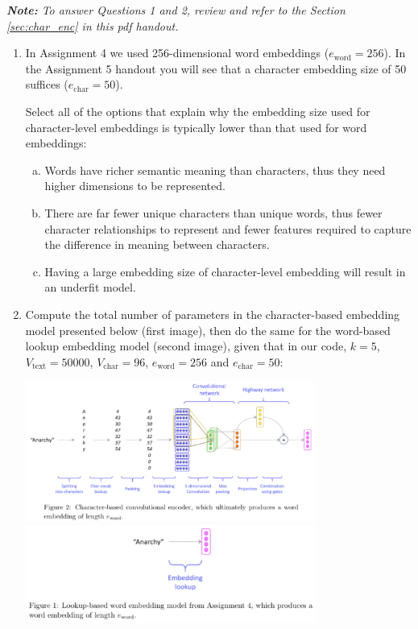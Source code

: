 {\em {\bf Note:} To answer Questions 1 and 2, review and refer to the Section \ref{sec:char_enc} in this pdf handout.}

\begin{enumerate}[1.]

\item {}

In Assignment 4 we used 256-dimensional word embeddings ($e_\text{word} = 256$). In the Assignment 5 handout you will see that a character embedding size of 50 suffices ($e_\text{char} = 50$).

Select all of the options that explain why the embedding size used for character-level embeddings is typically lower than that used for word embeddings:

\begin{enumerate}[(a)]
\item Words have richer semantic meaning than characters, thus they need higher dimensions to be represented.
\item There are far fewer unique characters than unique words, thus fewer character relationships to represent and fewer features required to capture the difference in meaning between characters.
\item Having a large embedding size of character-level embedding will result in an underfit model.
\end{enumerate}


\item Compute the total number of parameters in the character-based embedding model presented below (first image), then do the same for the word-based lookup embedding model (second image), given that in our code, $k = 5$, $V_\text{text}  = 50000$, $V_\text{char} = 96$, $e_\text{word} = 256$ and $e_\text{char} = 50$:

\begin{center}
\includegraphics[width=0.75\textwidth]{pre2-1.png}
\includegraphics[width=0.75\textwidth]{pre2-2.png}
\end{center}


\end{enumerate}
